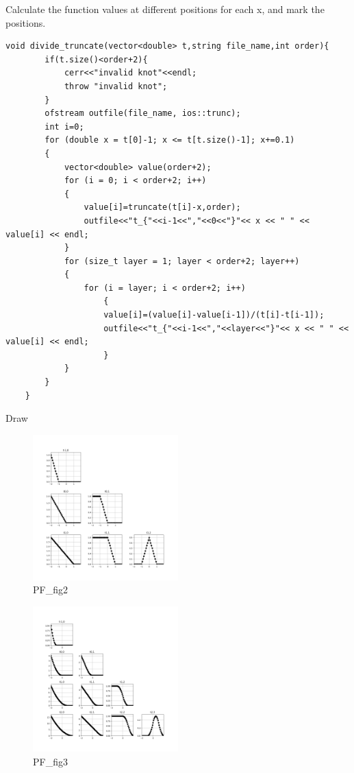\documentclass[a4paper]{article}
\begin{document}
Calculate the function values at different positions for each x, and mark the positions.
\begin{verbatim}
void divide_truncate(vector<double> t,string file_name,int order){
        if(t.size()<order+2){
            cerr<<"invalid knot"<<endl;
            throw "invalid knot";
        }
        ofstream outfile(file_name, ios::trunc);
        int i=0;
        for (double x = t[0]-1; x <= t[t.size()-1]; x+=0.1)
        {
            vector<double> value(order+2);
            for (i = 0; i < order+2; i++)
            {
                value[i]=truncate(t[i]-x,order);
                outfile<<"t_{"<<i-1<<","<<0<<"}"<< x << " " << value[i] << endl;
            }
            for (size_t layer = 1; layer < order+2; layer++)
            {
                for (i = layer; i < order+2; i++)
                    {
                    value[i]=(value[i]-value[i-1])/(t[i]-t[i-1]);
                    outfile<<"t_{"<<i-1<<","<<layer<<"}"<< x << " " << value[i] << endl;
                    }
            }
        }
    }
\end{verbatim}
Draw
\begin{figure}[H]
\centering
\includegraphics[width=0.5\textwidth]{../figure/PF_fig2.png}
\caption{PF\_fig2}
\end{figure}
\begin{figure}[H]
\centering
\includegraphics[width=0.5\textwidth]{../figure/PF_fig3.png}
\caption{PF\_fig3}
\end{figure}
\end{document}
